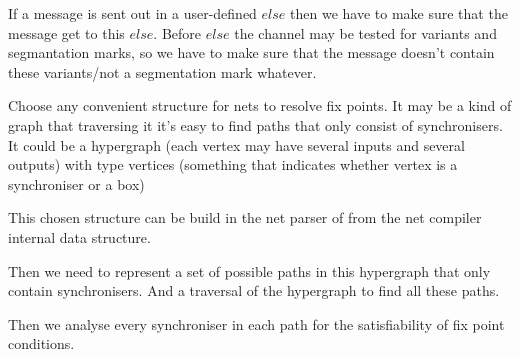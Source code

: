 If a message is sent out in a user-defined $else$ then we have to make sure that the message get to this $else$. Before $else$ the channel may be tested for variants and segmantation marks, so we have to make sure that the message doesn't contain these variants/not a segmentation mark whatever.


Choose any convenient structure for nets to resolve fix points. It may be a kind of graph that traversing it it's easy to find paths that only consist of synchronisers.
It could be a hypergraph (each vertex may have several inputs and several outputs) with type vertices (something that indicates whether vertex is a synchroniser or a box)

This chosen structure can be build in the net parser of from the net compiler internal data structure.

Then we need to represent a set of possible paths in this hypergraph that only contain synchronisers. And a traversal of the hypergraph to find all these paths.

Then we analyse every synchroniser in each path for the satisfiability of fix point conditions.

